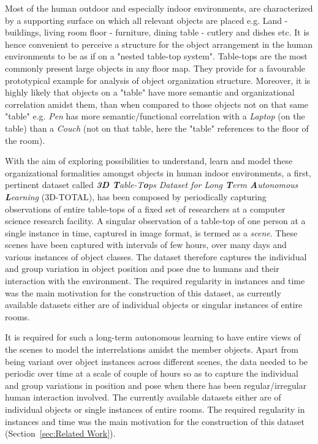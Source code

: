 \documentclass[letterpaper, 10 pt, conference]{ieeeconf}  %
\begin{document}
Most of the human outdoor and especially indoor environments, are characterized by a supporting surface on which all relevant objects are placed e.g. Land - buildings, living room floor - furniture, dining table - cutlery and dishes etc. It is hence convenient to perceive a structure for the object arrangement in the human environments to be as if on a "nested table-top system". Table-tops are the most commonly present large objects in any floor map. They provide for a favourable prototypical example for analysis of object organization structure. Moreover, it is highly likely that objects on a "table" have more semantic and organizational correlation amidst them, than when compared to those objects not on that same "table" e.g. \textit{Pen} has more semantic/functional correlation with a \textit{Laptop} (on the table) than a \textit{Couch} (not on that table, here the "table" references to the floor of the room).

With the aim of exploring possibilities to understand, learn and model these organizational formalities amongst objects in human indoor environments, a first, pertinent dataset called \textit{\textbf{3D T}able-T\textbf{o}ps Dataset for Long \textbf{T}erm \textbf{A}utonomous \textbf{L}earning} (3D-TOTAL), has been composed by periodically capturing observations of entire table-tops of a fixed set of researchers at a computer science research facility. A singular observation of a table-top of one person at a single instance in time, captured in image format, is termed as a \textit{scene}.
These scenes have been captured with intervals of few hours, over many days and various instances of object classes. The dataset therefore captures the individual and group variation in object position and pose due to humans and their interaction with the environment. The required regularity in instances and time was the main motivation for the construction of this dataset, as currently available datasets either are of individual objects or singular instances of entire rooms.

It is required for such a long-term autonomous learning to have entire views of the scenes to model the interrelations amidst the member objects. Apart from being variant over object instances across different scenes, the data needed to be periodic over time at a scale of couple of hours so as to capture the individual and group variations in position and pose when there has been regular/irregular human interaction involved. The currently available datasets either are of individual objects or single instances of entire rooms. The required regularity in instances and time was the main motivation for the construction of this dataset (Section~\ref{sec:Related Work}).
\end{document}
